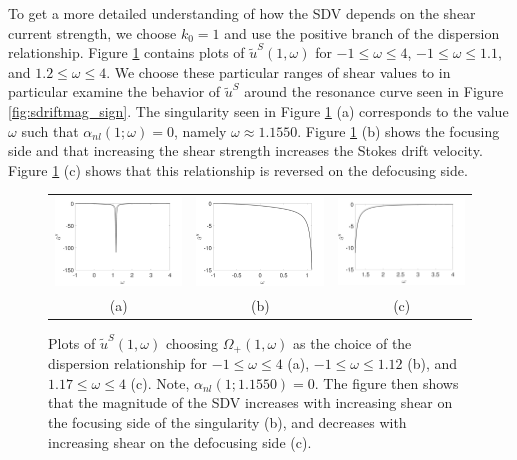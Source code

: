 \documentclass{JFM_Style/jfm}
\begin{document}
To get a more detailed understanding of how the SDV depends on the shear current strength, we choose $k_{0}=1$ and use the positive branch of the dispersion relationship.  Figure \ref{fig:stksdrfcomp} contains plots of $\tilde{u}^{S}(1,\omega)$ for $-1\leq \omega\leq 4$, $-1\leq \omega \leq 1.1$, and $1.2\le\omega\le4$.  We choose these particular ranges of shear values to in particular examine the behavior of $\tilde{u}^{S}$ around the resonance curve seen in Figure \ref{fig:sdriftmag_sign}.  The singularity seen in Figure \ref{fig:stksdrfcomp} (a) corresponds to the value $\omega$ such that $\alpha_{nl}(1;\omega)=0$, namely $\omega\approx1.1550$.  Figure \ref{fig:stksdrfcomp} (b) shows the focusing side and that increasing the shear strength increases the Stokes drift velocity.  Figure \ref{fig:stksdrfcomp} (c) shows that this relationship is reversed on the defocusing side.  
\begin{figure}
\centering
\begin{tabular}{ccc}
\includegraphics[width=.32\textwidth]{us_wide_range} & \includegraphics[width=.32\textwidth]{us_n1_to_1pt1} & \includegraphics[width=.32\textwidth]{us_1pt2_to_4}\\
(a) & (b) & (c)
\end{tabular}
\caption{\small Plots of $\tilde{u}^{S}(1,\omega)$ choosing $\Omega_{+}(1,\omega)$ as the choice of the dispersion relationship for $-1\leq \omega \leq 4$ (a), $-1\leq \omega \leq 1.12$ (b), and $1.17\leq \omega \leq 4$ (c).  Note, $\alpha_{nl}(1;1.1550)=0$.  The figure then shows that the magnitude of the SDV increases with increasing shear on the focusing side of the singularity (b), and decreases with increasing shear on the defocusing side (c).}
\label{fig:stksdrfcomp}
\end{figure}
\end{document}
